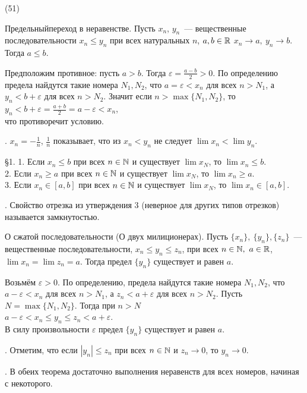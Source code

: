 (51)

\T \q Предельныйпереход в неравенстве. Пусть ${x_n}$, ${y_n}$~--- вещественные последовательности $x_n \le y_n$ при всех натуральных $n$, $a, b \in \mathbb{R}$ $x_n \to a,\ y_n \to b$. Тогда $a \le b$.

\D Предположим противное: пусть $a > b$. Тогда $\varepsilon = \frac{a - b}{2} > 0$. По определению предела найдутся такие номера $N_1, N_2$, что $a = \varepsilon < x_n$ для всех $n > N_1$, а $y_n < b + \varepsilon$ для всех $n > N_2$. Значит если $n > \max\{N_1, N_2\}$, то\\
$y_n < b + \varepsilon = \frac{a + b}{2} = a - \varepsilon < x_n$,\\
что противоречит условию.

. $x_n = -\frac{1}{n}$, $\frac{1}{n}$ показывает, что из $x_n < y_n$ не следует $\lim x_n < \lim y_n$.

\S1. 1. Если $x_n \le b$ при всех $n \in \mathbb{N}$ и существует $\lim x_N$, то $\lim x_n \le b$.\\
2. Если $x_n \ge a$ при всех $n \in \mathbb{N}$ и существует $\lim x_N$, то $\lim x_n \ge a$.\\
3. Если $x_n \in [a, b]$ при всех $n \in \mathbb{N}$ и существует $\lim x_N$, то $\lim x_n \in [a, b]$.

. Свойство отрезка из утверждения 3 (неверное для других типов отрезков) называется замкнутостью.

\T \q О сжатой последовательности (О двух милиционерах). Пусть $\{x_n\},\ \{y_n\}, \{z_n\}$~--- вещественные последовательности, $x_n \le y_n \le z_n$, при всех $n \in \mathbb{N},\ a \in \mathbb{R}$, $\lim x_n = \lim z_n = a$. Тогда предел $\{y_n\}$ существует и равен $a$.

\D Возьмём $\varepsilon > 0$. По определению, предела найдутся такие номера $N_1, N_2$, что $a - \varepsilon < x_n$ для всех $n > N_1$, а $z_n < a + \varepsilon$ для всех $n > N_2$. Пусть $N = \max\{N_1, N_2\}$. Тогда при $n > N$\\
$a - \varepsilon < x_n \le y_n \le z_n < a + \varepsilon$.\\
В силу произвольности $\varepsilon$ предел $\{y_n\}$ существует и равен $a$.

. Отметим, что если $|y_n| \le z_n$ при всех $n \in \mathbb{N}$ и $z_n \to 0$, то $y_n\to 0$.

. В обеих теорема достаточно  выполнения неравенств для всех номеров, начиная с некоторого.
